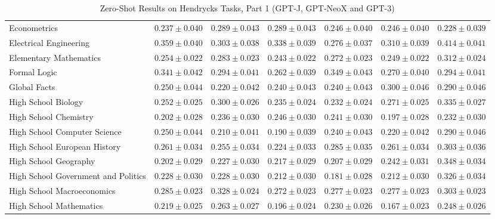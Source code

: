\documentclass[11pt]{article}
\begin{document}
{\begin{landscape}
\begin{table}
\begin{tabular}{l c c c c c c }
Econometrics & $0.237 \pm 0.040$ & $0.289 \pm 0.043$ & $0.289 \pm 0.043$ & $0.246 \pm 0.040$ & $0.246 \pm 0.040$ & $0.228 \pm 0.039$ \\ 
Electrical Engineering & $0.359 \pm 0.040$ & $0.303 \pm 0.038$ & $0.338 \pm 0.039$ & $0.276 \pm 0.037$ & $0.310 \pm 0.039$ & $0.414 \pm 0.041$ \\ 
Elementary Mathematics & $0.254 \pm 0.022$ & $0.283 \pm 0.023$ & $0.243 \pm 0.022$ & $0.272 \pm 0.023$ & $0.249 \pm 0.022$ & $0.312 \pm 0.024$ \\ 
Formal Logic & $0.341 \pm 0.042$ & $0.294 \pm 0.041$ & $0.262 \pm 0.039$ & $0.349 \pm 0.043$ & $0.270 \pm 0.040$ & $0.294 \pm 0.041$ \\ 
Global Facts & $0.250 \pm 0.044$ & $0.220 \pm 0.042$ & $0.240 \pm 0.043$ & $0.240 \pm 0.043$ & $0.300 \pm 0.046$ & $0.290 \pm 0.046$ \\ 
High School Biology & $0.252 \pm 0.025$ & $0.300 \pm 0.026$ & $0.235 \pm 0.024$ & $0.232 \pm 0.024$ & $0.271 \pm 0.025$ & $0.335 \pm 0.027$ \\ 
High School Chemistry & $0.202 \pm 0.028$ & $0.236 \pm 0.030$ & $0.246 \pm 0.030$ & $0.241 \pm 0.030$ & $0.197 \pm 0.028$ & $0.232 \pm 0.030$ \\ 
High School Computer Science & $0.250 \pm 0.044$ & $0.210 \pm 0.041$ & $0.190 \pm 0.039$ & $0.240 \pm 0.043$ & $0.220 \pm 0.042$ & $0.290 \pm 0.046$ \\ 
High School European History & $0.261 \pm 0.034$ & $0.255 \pm 0.034$ & $0.224 \pm 0.033$ & $0.285 \pm 0.035$ & $0.261 \pm 0.034$ & $0.303 \pm 0.036$ \\ 
High School Geography & $0.202 \pm 0.029$ & $0.227 \pm 0.030$ & $0.217 \pm 0.029$ & $0.207 \pm 0.029$ & $0.242 \pm 0.031$ & $0.348 \pm 0.034$ \\ 
High School Government and Politics & $0.228 \pm 0.030$ & $0.228 \pm 0.030$ & $0.212 \pm 0.030$ & $0.181 \pm 0.028$ & $0.212 \pm 0.030$ & $0.326 \pm 0.034$ \\ 
High School Macroeconomics & $0.285 \pm 0.023$ & $0.328 \pm 0.024$ & $0.272 \pm 0.023$ & $0.277 \pm 0.023$ & $0.277 \pm 0.023$ & $0.303 \pm 0.023$ \\
High School Mathematics & $0.219 \pm 0.025$ & $0.263 \pm 0.027$ & $0.196 \pm 0.024$ & $0.230 \pm 0.026$ & $0.167 \pm 0.023$ & $0.248 \pm 0.026$ \\ 
\bottomrule\end{tabular}
\caption{Zero-Shot Results on Hendrycks Tasks, Part 1 (GPT-J, GPT-NeoX and GPT-3)}
\label{tab:hendrycks-gpt1}
\end{table}


\end{landscape}}
\end{document}
